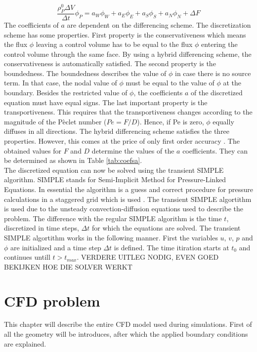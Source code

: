 \documentclass{CFD2017}
\begin{document}
\begin{equation}
\label{Substituted}
\frac{\rho_P^0 \Delta V}{\Delta t}\phi_P=a_W\phi_W+a_E\phi_E+a_S\phi_S+a_N\phi_N +\Delta F
\end{equation}
The coefficients of $a$ are dependent on the differencing scheme. The discretization scheme has some properties. First property is the conservativeness which means the flux $\phi$ leaving a control volume has to be equal to the flux $\phi$ entering the control volume through the same face. By using a hybrid differencing scheme, the conservativeness is automatically satisfied. The second property is the boundedness. The boundedness describes the value of $\phi$ in case there is no source term. In that case, the nodal value of $\phi$ must be equal to the value of $\phi$ at the boundary. Besides the restricted value of $\phi$, the coefficients $a$ of the discretized equation must have equal signs. The last important property is the transportiveness. This requires that the transportiveness changes according to the magnitude of the P\`{e}clet number ($Pe=F/D$). Hence, if Pe is zero, $\phi$ equally diffuses in all directions. The hybrid differencing scheme satisfies the three properties. However, this comes at the price of only first order accuracy \cite{Versteeg2007}. The obtained values for $F$ and $D$ determine the values of the $a$ coefficients. They can be determined as shown in Table \ref{tab:coefsa}.
\\
The discretized equation can now be solved using the transient SIMPLE algorithm. SIMPLE stands for Semi-Implicit Method for Pressure-Linked Equations. In essential the algorithm is a guess and correct procedure for pressure calculations in a staggered grid which is used \cite{Versteeg2007}. The transient SIMPLE algortithm is used due to the unsteady convection-diffusion equations used to describe the problem. The difference with the regular SIMPLE algorithm is the time $t$, discretized in time steps, $\Delta t$ for which the equations are solved. The transient SIMPLE algortithm works in the following manner. First the variables $u$, $v$, $p$ and $\phi$ are initialized and a time step $\Delta t$ is defined. The time itiration starts at $t_0$ and continues untill $t>t_{max}$. VERDERE UITLEG NODIG, EVEN GOED BEKIJKEN HOE DIE SOLVER WERKT

\section{CFD problem}
This chapter will describe the entire CFD model used during simulations. First of all the geometry will be introduces, after which the applied boundary conditions are explained.
\end{document}
